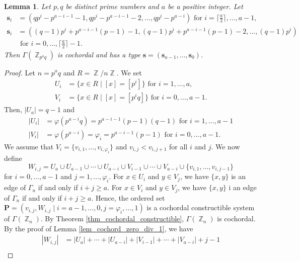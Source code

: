 \documentclass[12pt,amscd]{amsart}
\newtheorem{lem}[thm]{Lemma}
\theoremstyle{definition}
\numberwithin{equation}{section}
\DeclareMathOperator{\ZZ}{\mathbb {Z}}
\def\P {\mathbf P}
\def\s {\mathbf s}
\begin{document}
\begin{lem}\label{lem_cochord_zero_div_2} Let $p,q$ be distinct prime numbers and $a$ be a positive integer. Let 
\begin{align*}
    \s_i &= (qp^i - p^{a-i-1}-1, qp^i - p^{a-i-1} -2, \ldots, qp^i - p^{a-i}) \text{ for }i=\lceil \frac{a}{2} \rceil,\ldots, a-1,\\
    \s_i & = ((q-1)p^i + p^{a-i-1}(p-1) -1, (q-1)p^i + p^{a-i-1}(p-1) -2, \ldots, (q-1)p^i) \\
        & \text{ for } i = 0, \ldots, \lceil \frac{a}{2} \rceil - 1.
\end{align*} 
Then $\Gamma(\ZZ_{p^aq})$ is cochordal and has a type $\s = (\s_{a-1}, \ldots, \s_0)$.
\end{lem}
\begin{proof} Let $n = p^aq$ and $R = \ZZ/n \ZZ$. We set
\begin{align*}
    U_i &= \{x \in R \mid [x] = [p^i]\} \text{ for } i = 1, \ldots, a,\\
    V_i &= \{x \in R \mid [x] = [p^iq]\} \text{ for } i = 0, \ldots, a-1.
\end{align*}
Then, $|U_a| = q-1$ and 
\begin{align*}
    |U_i| & = \varphi(p^{a-i}q) = p^{a-i-1}(p-1)(q-1) \text{ for } i =1, \ldots, a-1\\
    |V_i| & = \varphi(p^{a-i}) = \varphi_i = p^{a-i-1}(p-1) \text{ for } i = 0, \ldots, a-1. 
\end{align*}
We assume that $V_i = \{v_{i,1}, \ldots, v_{i,\varphi_i}\}$ and $v_{i,j} < v_{i,j+1}$ for all $i$ and $j$. We now define 
    \begin{equation*}
        W_{i,j} = U_{a} \cup U_{a-1} \cup \cdots \cup U_{a -i} \cup V_{i-1} \cup \cdots \cup V_{a-i} \cup  \{ v_{i,1}, \ldots, v_{i,j-1} \}
    \end{equation*}
    for $i = 0, \ldots, a-1$ and $j = 1, \ldots, \varphi_i$. For $x\in U_i$ and $y \in V_j$, we have $\{x,y\}$ is an edge of $\Gamma_n$ if and only if $i + j \ge a$. For $x \in V_i$ and $y \in V_j$, we have $\{x,y\}$ i an edge of $\Gamma_n$ if and only if $i + j \ge a$. Hence, the ordered set $\P = (v_{i,j},W_{i,j} \mid i = a-1, \ldots, 0, j = \varphi_i, \ldots, 1)$ is a cochordal constructible system of $\Gamma(\ZZ_n)$. By Theorem \ref{thm_cochordal_constructible}, $\Gamma(\ZZ_n)$ is cochordal. By the proof of Lemma \ref{lem_cochord_zero_div_1}, we have 
    \begin{align*}
        |W_{i,j}| & = |U_{a}| + \cdots + |U_{a-i}| + |V_{i-1}| + \cdots + |V_{a-i}| + j-1\\

\end{align*}
\end{proof}
\end{document}
